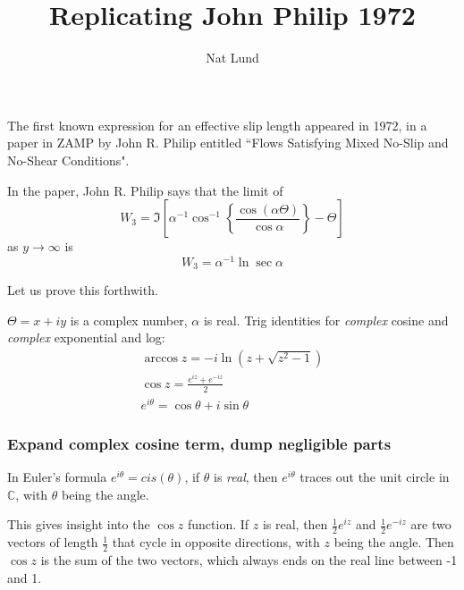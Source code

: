 \documentclass[a4paper]{report}
\title{Replicating John Philip 1972}
\author{Nat Lund}
\begin{document}
\maketitle

The first known expression for an effective slip length appeared in 1972, in a paper in ZAMP by John R. Philip entitled ``Flows Satisfying Mixed No-Slip and No-Shear Conditions".

In the paper, John R. Philip says that the limit of
\begin{equation}
W_{3} = \Im \left[  
 \alpha^{-1} \cos^{-1} 
 \left\{ \frac{\cos(\alpha \Theta)}{\cos \alpha} \right\} - \Theta
   \right]
\end{equation}
as $y\rightarrow \infty$ is
\begin{equation}
W_{3} = \alpha^{-1} \ln \sec \alpha
\end{equation}

Let us prove this forthwith.
\vspace*{1em}

$\Theta = x + iy$ is a complex number, $\alpha$ is real.  Trig identities for \emph{complex} cosine and \emph{complex} exponential and log:
\begin{gather}
\arccos z = - i \ln (z + \sqrt{z^{2} - 1}) \\
\cos z = \frac{e^{iz}+e^{-iz}}{2} \\
e^{i \theta} = \cos \theta + i \sin \theta 
\end{gather}

\subsubsection*{Expand complex cosine term, dump negligible parts}

In Euler's formula $e^{i\theta} = cis(\theta)$, if $\theta$ is \emph{real}, then $e^{i \theta}$ traces out the unit circle in $\mathbb{C}$, with $\theta$ being the angle.
\begin{center}
\end{center}

This gives insight into the $\cos z$ function.  If $z$ is real, then $\frac{1}{2} e^{iz}$ and $\frac{1}{2} e^{-iz}$ are two vectors of length $\frac{1}{2}$ that cycle in opposite directions, with $z$ being the angle. Then $\cos z$ is the sum of the two vectors, which always ends on the real line between -1 and 1. 
\end{document}
